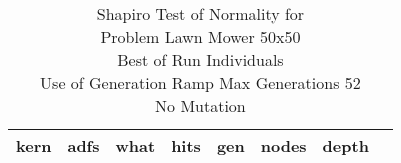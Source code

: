 \begin{table}[H]
\caption{Shapiro Test of Normality for \\ Problem  Lawn Mower 50x50\\Best of Run Individuals \\ Use of Generation Ramp  Max Generations 52\\ No Mutation \\}
\begin{center}
\scalebox{0.8} %
{
\begin{tabular}{lrrrrrrr}
\hline
kern & adfs & what & hits & gen & nodes & depth \\
\hline


\end{tabular}
}
\end{center}
\end{table}


